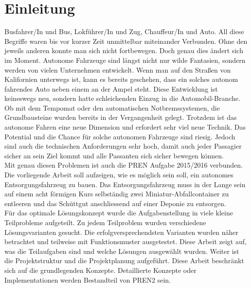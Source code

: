 \section{Einleitung}
Busfahrer/In und Bus, Lokführer/In und Zug, Chauffeur/In und Auto. All diese Begriffe waren bis vor kurzer Zeit unmittelbar miteinander Verbunden. Ohne den jeweils anderen konnte man sich nicht fortbewegen. Doch genau dies ändert sich im Moment. Autonome Fahrzeuge sind längst nicht nur wilde Fantasien, sondern werden von vielen Unternehmen entwickelt. Wenn man auf den Straßen von Kalifornien unterwegs ist, kann es bereits geschehen, dass ein solches autonom fahrendes Auto neben einem an der Ampel steht. Diese Entwicklung ist keineswegs neu, sondern hatte schleichenden Einzug in die Automobil-Branche. Ob mit dem Tempomat oder den automatischen Notbremssystemen, die Grundbausteine wurden bereits in der Vergangenheit gelegt.
Trotzdem ist das autonome Fahren eine neue Dimension und erfordert sehr viel neue Technik. Das Potential und die Chance für solche autonomen Fahrzeuge sind riesig. Jedoch sind auch die technischen Anforderungen sehr hoch, damit auch jeder Passagier sicher an sein Ziel kommt und alle Passanten sich sicher bewegen können. \\
Mit genau diesen Problemen ist auch die PREN Aufgabe 2015/2016 verbunden. Die vorliegende Arbeit soll aufzeigen, wie es möglich sein soll, ein autonomes Entsorgungsfahrzeug zu bauen. Das Entsorgungsfahrzeug muss in der Lange sein auf einem acht förmigen Kurs selbständig zwei Miniatur-Abfallcontainer zu entleeren und das Schüttgut anschliessend auf einer Deponie zu entsorgen.\\
Für das optimale Lösungskonzept wurde die Aufgabenstellung in viele kleine Teilprobleme aufgeteilt. Zu jedem Teilproblem wurden verschiedene Lösungsvarianten gesucht. Die erfolgversprechendsten Varianten wurden näher betrachtet und teilweise mit Funktionsmuster ausgetestet. Diese Arbeit zeigt auf, was die Teilaufgaben sind und welche Lösungen ausgewählt wurden. Weiter ist die Projektstruktur und die Projektplanung aufgeführt. Diese Arbeit beschränkt sich auf die grundlegenden Konzepte. Detaillierte Konzepte oder Implementationen werden Bestandteil von PREN2 sein. 
